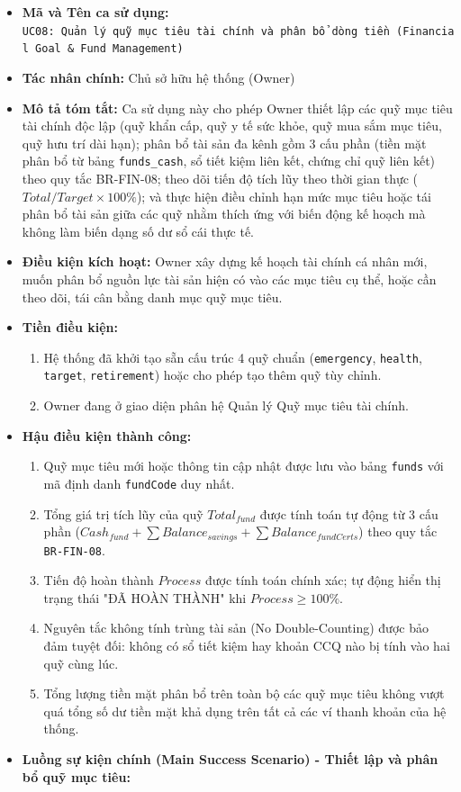 \documentclass[11pt,a4paper]{article}
\providecommand{\tightlist}{
  \setlength{\itemsep}{0pt}\setlength{\parskip}{0pt}}
\begin{document}
\begin{itemize}
\tightlist
\item
  \textbf{Mã và Tên ca sử dụng:}
  \texttt{UC08:\ Quản\ lý\ quỹ\ mục\ tiêu\ tài\ chính\ và\ phân\ bổ\ dòng\ tiền\ (Financial\ Goal\ \&\ Fund\ Management)}
\item
  \textbf{Tác nhân chính:} Chủ sở hữu hệ thống (Owner)
\item
  \textbf{Mô tả tóm tắt:} Ca sử dụng này cho phép Owner thiết lập các
  quỹ mục tiêu tài chính độc lập (quỹ khẩn cấp, quỹ y tế sức khỏe, quỹ
  mua sắm mục tiêu, quỹ hưu trí dài hạn); phân bổ tài sản đa kênh gồm 3
  cấu phần (tiền mặt phân bổ từ bảng \texttt{funds\_cash}, sổ tiết kiệm
  liên kết, chứng chỉ quỹ liên kết) theo quy tắc BR-FIN-08; theo dõi
  tiến độ tích lũy theo thời gian thực
  (\(Total / Target \times 100\%\)); và thực hiện điều chỉnh hạn mức mục
  tiêu hoặc tái phân bổ tài sản giữa các quỹ nhằm thích ứng với biến
  động kế hoạch mà không làm biến dạng số dư sổ cái thực tế.
\item
  \textbf{Điều kiện kích hoạt:} Owner xây dựng kế hoạch tài chính cá
  nhân mới, muốn phân bổ nguồn lực tài sản hiện có vào các mục tiêu cụ
  thể, hoặc cần theo dõi, tái cân bằng danh mục quỹ mục tiêu.
\item
  \textbf{Tiền điều kiện:}

  \begin{enumerate}
  \def\labelenumi{\arabic{enumi}.}
  \tightlist
  \item
    Hệ thống đã khởi tạo sẵn cấu trúc 4 quỹ chuẩn (\texttt{emergency},
    \texttt{health}, \texttt{target}, \texttt{retirement}) hoặc cho phép
    tạo thêm quỹ tùy chỉnh.
  \item
    Owner đang ở giao diện phân hệ Quản lý Quỹ mục tiêu tài chính.
  \end{enumerate}
\item
  \textbf{Hậu điều kiện thành công:}

  \begin{enumerate}
  \def\labelenumi{\arabic{enumi}.}
  \tightlist
  \item
    Quỹ mục tiêu mới hoặc thông tin cập nhật được lưu vào bảng
    \texttt{funds} với mã định danh \texttt{fundCode} duy nhất.
  \item
    Tổng giá trị tích lũy của quỹ \(Total_{fund}\) được tính toán tự
    động từ 3 cấu phần
    (\(Cash_{fund} + \sum Balance_{savings} + \sum Balance_{fundCerts}\))
    theo quy tắc \texttt{BR-FIN-08}.
  \item
    Tiến độ hoàn thành \(Process\) được tính toán chính xác; tự động
    hiển thị trạng thái "ĐÃ HOÀN THÀNH" khi \(Process \ge 100\%\).
  \item
    Nguyên tắc không tính trùng tài sản (No Double-Counting) được bảo
    đảm tuyệt đối: không có sổ tiết kiệm hay khoản CCQ nào bị tính vào
    hai quỹ cùng lúc.
  \item
    Tổng lượng tiền mặt phân bổ trên toàn bộ các quỹ mục tiêu không vượt
    quá tổng số dư tiền mặt khả dụng trên tất cả các ví thanh khoản của
    hệ thống.
  \end{enumerate}
\item
  \textbf{Luồng sự kiện chính (Main Success Scenario) - Thiết lập và
  phân bổ quỹ mục tiêu:}


\end{itemize}
\end{document}
